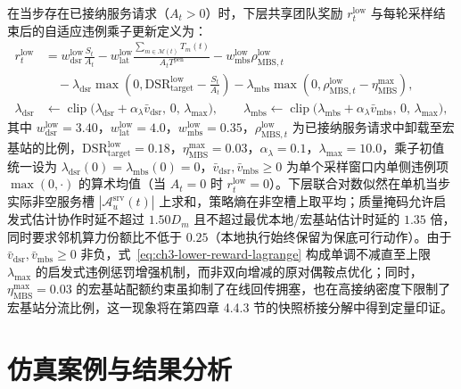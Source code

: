 在当步存在已接纳服务请求（$A_t>0$）时，下层共享团队奖励 $r_t^{\mathrm{low}}$ 与每轮采样结束后的自适应违例乘子更新定义为：
\begin{equation}
 \begin{aligned}
 r_t^{\mathrm{low}}&=w_{\mathrm{dsr}}^{\mathrm{low}}\frac{S_t}{A_t}
  -w_{\mathrm{lat}}^{\mathrm{low}}\frac{\sum_{m\in\mathcal M(t)}T_m(t)}{A_t T^{\mathrm{pen}}}
  -w_{\mathrm{mbs}}^{\mathrm{low}}\rho_{\mathrm{MBS},t}^{\mathrm{low}}\\
 &\quad-\lambda_{\mathrm{dsr}}\max\!\left(0,\mathrm{DSR}_{\mathrm{target}}^{\mathrm{low}}-\frac{S_t}{A_t}\right)
  -\lambda_{\mathrm{mbs}}\max\!\left(0,\rho_{\mathrm{MBS},t}^{\mathrm{low}}-\eta_{\mathrm{MBS}}^{\max}\right),\\
 \lambda_{\mathrm{dsr}}&\leftarrow\operatorname{clip}\!\big(\lambda_{\mathrm{dsr}}+\alpha_\lambda\bar v_{\mathrm{dsr}},\,0,\,\lambda_{\max}\big),\qquad
 \lambda_{\mathrm{mbs}}\leftarrow\operatorname{clip}\!\big(\lambda_{\mathrm{mbs}}+\alpha_\lambda\bar v_{\mathrm{mbs}},\,0,\,\lambda_{\max}\big),
 \end{aligned}
 \label{eq:ch3-lower-reward-lagrange}
\end{equation}
其中 $w_{\mathrm{dsr}}^{\mathrm{low}}=3.40$，$w_{\mathrm{lat}}^{\mathrm{low}}=4.0$，$w_{\mathrm{mbs}}^{\mathrm{low}}=0.35$，$\rho_{\mathrm{MBS},t}^{\mathrm{low}}$ 为已接纳服务请求中卸载至宏基站的比例，$\mathrm{DSR}_{\mathrm{target}}^{\mathrm{low}}=0.18$，$\eta_{\mathrm{MBS}}^{\max}=0.03$，$\alpha_\lambda=0.1$，$\lambda_{\max}=10.0$，乘子初值统一设为 $\lambda_{\mathrm{dsr}}(0)=\lambda_{\mathrm{mbs}}(0)=0$，$\bar{v}_{\mathrm{dsr}},\bar{v}_{\mathrm{mbs}}\geq 0$ 为单个采样窗口内单侧违例项 $\max(0,\cdot)$ 的算术均值（当 $A_t=0$ 时 $r_t^{\mathrm{low}}=0$）。下层联合对数似然在单机当步实际非空服务槽 $|\mathcal{A}_u^{\mathrm{srv}}(t)|$ 上求和，策略熵在非空槽上取平均；质量掩码允许启发式估计协作时延不超过 $1.50D_m$ 且不超过最优本地/宏基站估计时延的 $1.35$ 倍，同时要求邻机算力份额比不低于 $0.25$（本地执行始终保留为保底可行动作）。由于 $\bar{v}_{\mathrm{dsr}},\bar{v}_{\mathrm{mbs}}\geq 0$ 非负，式~\eqref{eq:ch3-lower-reward-lagrange} 构成单调不减直至上限 $\lambda_{\max}$ 的启发式违例惩罚增强机制，而非双向增减的原对偶鞍点优化；同时，$\eta_{\mathrm{MBS}}^{\max}=0.03$ 的宏基站配额约束虽抑制了在线回传拥塞，也在高接纳密度下限制了宏基站分流比例，这一现象将在第四章 4.4.3 节的快照桥接分解中得到定量印证。

\section{仿真案例与结果分析}
\label{sec:upper-evidence}
\label{sec:sim-params}
\label{sec:ch3-protocol}

